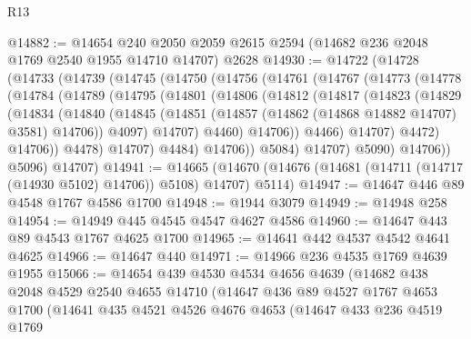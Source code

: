 \begin{lexlean}{R13}
\begin{coremodule}
@14882 := @14654
    @240
    @2050
    @2059
    @2615
    @2594
    (@14682 @236 @2048 @1769 @2540 @1955 @14710 @14707)
    @2628
@14930 := @14722
    (@14728
      (@14733
        (@14739
          (@14745
            (@14750
              (@14756
                (@14761
                  (@14767
                    (@14773
                      (@14778
                        (@14784
                          (@14789
                            (@14795
                              (@14801
                                (@14806
                                  (@14812
                                    (@14817
                                      (@14823
                                        (@14829
                                          (@14834
                                            (@14840
                                              (@14845
                                                (@14851
                                                  (@14857
                                                    (@14862 (@14868 @14882 @14707) @3581)
                                                    @14706))
                                                @4097)
                                              @14707)
                                            @4460)
                                          @14706))
                                      @4466)
                                    @14707)
                                  @4472)
                                @14706))
                            @4478)
                          @14707)
                        @4484)
                      @14706))
                  @5084)
                @14707)
              @5090)
            @14706))
        @5096)
      @14707)
@14941 := @14665
    (@14670 (@14676 (@14681 (@14711 (@14717 (@14930 @5102) @14706)) @5108) @14707) @5114)
@14947 := @14647 @446 @89 @4548 @1767 @4586 @1700
@14948 := @1944 @3079
@14949 := @14948 @258
@14954 := @14949 @445 @4545 @4547 @4627 @4586
@14960 := @14647 @443 @89 @4543 @1767 @4625 @1700
@14965 := @14641 @442 @4537 @4542 @4641 @4625
@14966 := @14647 @440
@14971 := @14966 @236 @4535 @1769 @4639 @1955
@15066 := @14654
    @439
    @4530
    @4534
    @4656
    @4639
    (@14682
      @438
      @2048
      @4529
      @2540
      @4655
      @14710
      (@14647
        @436
        @89
        @4527
        @1767
        @4653
        @1700
        (@14641
          @435
          @4521
          @4526
          @4676
          @4653
          (@14647
            @433
            @236
            @4519
            @1769

\end{coremodule}
\end{lexlean}
